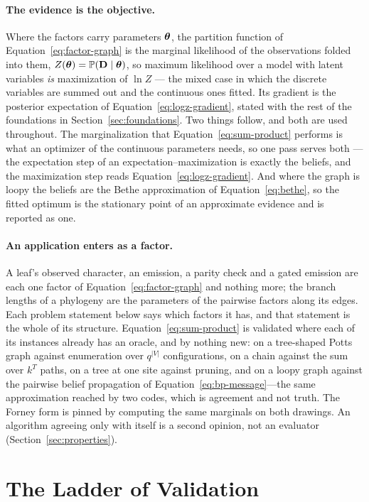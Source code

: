 \documentclass[11pt,a4paper]{article}
\begin{document}
\paragraph{The evidence is the objective.}
Where the factors carry parameters $\boldsymbol{\theta}$, the partition function of
Equation~\ref{eq:factor-graph} is the marginal likelihood of the observations
folded into them, $Z(\boldsymbol{\theta}) = \mathbb{P}(\mathbf{D} \mid \boldsymbol{\theta})$, so maximum
likelihood over a model with latent variables \emph{is} maximization of
$\ln Z$ --- the mixed case in which the discrete variables are summed out and
the continuous ones fitted. Its gradient is the posterior expectation of
Equation~\ref{eq:logz-gradient}, stated with the rest of the foundations in
Section~\ref{sec:foundations}. Two things
follow, and both are used throughout. The marginalization that
Equation~\ref{eq:sum-product} performs is what an optimizer of the continuous
parameters needs, so one pass serves both --- the expectation step of an
expectation--maximization is exactly the beliefs, and the maximization step
reads Equation~\ref{eq:logz-gradient}. And where the graph is loopy the beliefs
are the Bethe approximation of Equation~\ref{eq:bethe}, so the fitted optimum
is the stationary point of an approximate evidence and is reported as one.

\paragraph{An application enters as a factor.}
A leaf's observed character, an emission, a parity check and a gated emission
are each one factor of Equation~\ref{eq:factor-graph} and nothing more; the
branch lengths of a phylogeny are the parameters of the pairwise factors along
its edges. Each problem statement below says which factors it has, and that
statement is the whole of its structure.
Equation~\ref{eq:sum-product} is validated where each of its instances already
has an oracle, and by nothing new: on a tree-shaped Potts graph against
enumeration over $q^{|V|}$ configurations, on a chain against the sum over
$k^T$ paths, on a tree at one site against pruning, and on a loopy graph
against the pairwise belief propagation of Equation~\ref{eq:bp-message}---the
same approximation reached by two codes, which is agreement and not truth. The
Forney form is pinned by computing the same marginals on both drawings. An
algorithm agreeing only with itself is a second opinion, not an evaluator
(Section~\ref{sec:properties}).

\section{The Ladder of Validation}
\label{sec:ladder}
\end{document}
